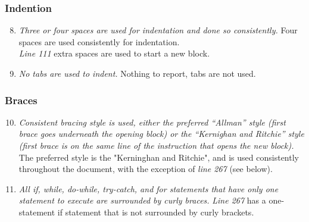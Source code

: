 	\subsubsection{Indention}
		\begin{enumerate}
			\setcounter{enumi}{7}
			\item \textit{Three or four spaces are used for indentation and done so consistently.}\newline
			Four spaces are used consistently for indentation. \\
			\textit{Line 111} extra spaces are used to start a new block.

			\item \textit{No tabs are used to indent.}\newline
			Nothing to report, tabs are not used. 

		\end{enumerate}

	\subsubsection{Braces}
		\begin{enumerate}
			\setcounter{enumi}{9}
			\item \textit{Consistent bracing style is used, either the preferred “Allman” style (first brace goes underneath the opening block) or the “Kernighan and Ritchie” style (first brace is on the same line of the instruction that opens the new block).}\newline
			The preferred style is the "Kerninghan and Ritchie", and is used consistently throughout the document, with the exception of \textit{line 267} (see below). %

			\item \textit{All if, while, do-while, try-catch, and for statements that have only one statement to execute are surrounded by curly braces.}
			\textit{Line 267} has a one-statement if statement that is not surrounded by curly brackets. 
			
		\end{enumerate}

